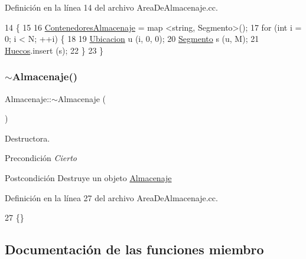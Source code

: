 Definición en la línea 14 del archivo Area\+De\+Almacenaje.\+cc.


\begin{DoxyCode}
14                                     \{
15     
16     \hyperlink{class_almacenaje_ab3cfe0feaf244094a7e2c5225ee681e6}{ContenedoresAlmacenaje} = map <string, Segmento>();
17     \textcolor{keywordflow}{for} (\textcolor{keywordtype}{int} i = 0; i < N; ++i) \{
18         
19         \hyperlink{class_ubicacion}{Ubicacion} u (i, 0, 0);
20         \hyperlink{class_segmento}{Segmento} s (u, M);
21         \hyperlink{class_almacenaje_ac7f1f8559babe3ac7841bb7f9e50d79a}{Huecos}.insert (s);
22     \}
23 \}
\end{DoxyCode}
\mbox{\label{class_almacenaje_a81867a2596bd5b0d654803fc34d8bc9a}} 
\subsubsection{\texorpdfstring{$\sim$\+Almacenaje()}{~Almacenaje()}}
{\footnotesize\ttfamily Almacenaje\+::$\sim$\+Almacenaje (\begin{DoxyParamCaption}{ }\end{DoxyParamCaption})}



Destructora. 

\begin{DoxyPrecond}{Precondición}
{\itshape Cierto} 
\end{DoxyPrecond}
\begin{DoxyPostcond}{Postcondición}
Destruye un objeto \hyperlink{class_almacenaje}{Almacenaje} 
\end{DoxyPostcond}


Definición en la línea 27 del archivo Area\+De\+Almacenaje.\+cc.


\begin{DoxyCode}
27 \{\}
\end{DoxyCode}


\subsection{Documentación de las funciones miembro}
\mbox{\label{class_almacenaje_aa4a16321fcfba32873521b9af6c8b73a}} 
